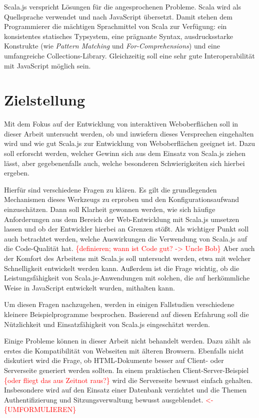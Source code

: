 \documentclass[a4paper, 12pt, hidelinks, listof=totoc, listoftables=totoc, bibliography=totoc]{scrreprt}
\newcommand{\TODOi}[1]{\textcolor{red}{\{#1\}}}
\newcommand{\REDOi}{\textcolor{red}{<- \{UMFORMULIEREN\}~}}
\begin{document}
Scala.js verspricht Lösungen für die angesprochenen Probleme. Scala wird als Quellsprache verwendet und nach JavaScript übersetzt. Damit stehen dem Programmierer die mächtigen Sprachmittel von Scala zur Verfügung: ein konsistentes statisches Typsystem, eine prägnante Syntax, ausdrucksstarke Konstrukte (wie \emph{Pattern Matching} und \emph{For-Comprehensions}) und eine umfangreiche Collections-Library. Gleichzeitig soll eine sehr gute Interoperabilität mit JavaScript möglich sein.


\section{Zielstellung}

Mit dem Fokus auf der Entwicklung von interaktiven Weboberflächen soll in dieser Arbeit untersucht werden, ob und inwiefern dieses Versprechen eingehalten wird und wie gut Scala.js zur Entwicklung von Weboberflächen geeignet ist. Dazu soll erforscht werden, welcher Gewinn sich aus dem Einsatz von Scala.js ziehen lässt, aber gegebenenfalls auch, welche besonderen Schwierigkeiten sich hierbei ergeben.

Hierfür sind verschiedene Fragen zu klären. Es gilt die grundlegenden Mechanismen dieses Werkzeugs zu erproben und den Konfigurationsaufwand einzuschätzen. Dann soll Klarheit gewonnen werden, wie sich häufige Anforderungen aus dem Bereich der Web-Entwicklung mit Scala.js umsetzen lassen und ob der Entwickler hierbei an Grenzen stößt. Als wichtiger Punkt soll auch betrachtet werden, welche Auswirkungen die Verwendung von Scala.js auf die Code-Qualität hat. \TODOi{definieren; wann ist Code gut? -> Uncle Bob} Aber auch der Komfort des Arbeitens mit Scala.js soll untersucht werden, etwa mit welcher Schnelligkeit entwickelt werden kann. Außerdem ist die Frage wichtig, ob die Leistungsfähigkeit von Scala.js-Anwendungen mit solchen, die auf herkömmliche Weise in JavaScript entwickelt wurden, mithalten kann.

Um diesen Fragen nachzugehen, werden in einigen Fallstudien verschiedene kleinere Beispielprogramme besprochen. Basierend auf diesen Erfahrung soll die Nützlichkeit und Einsatzfähigkeit von Scala.js eingeschätzt werden.

Einige Probleme können in dieser Arbeit nicht behandelt werden. Dazu zählt als erstes die Kompatibilität von Webseiten mit älteren Browsern. Ebenfalls nicht diskutiert wird die Frage, ob \ac{HTML}-Dokumente besser auf Client- oder Serverseite generiert werden sollten. In einem praktischen Client-Server-Beispiel \TODOi{oder fliegt das aus Zeitnot raus?} wird die Serverseite bewusst einfach gehalten. Insbesondere wird auf den Einsatz einer Datenbank verzichtet und die Themen Authentifizierung und Sitzungsverwaltung bewusst ausgeblendet. \REDOi
\end{document}
